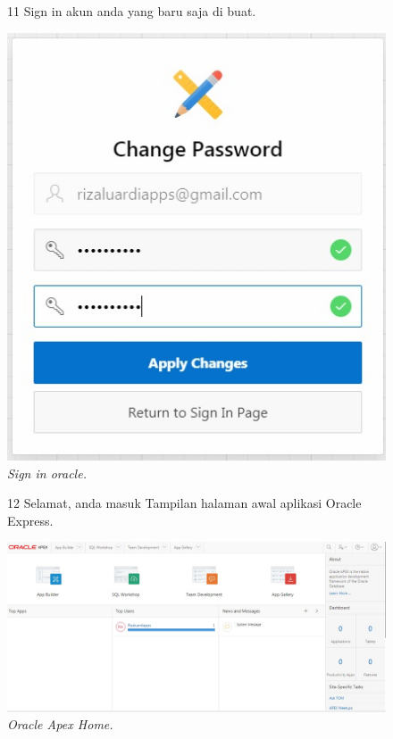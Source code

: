 \begin{enumerate}
\begin{figure}
\item[11] Sign in akun anda yang baru saja di buat.

    \begin{center}
\includegraphics[scale=0.5]{figures/req9.jpg}
    \caption{\textit{Sign in oracle.}}
        \end{center}
\label{gambar}
\end{figure}

\begin{figure}
\item[12] Selamat, anda masuk Tampilan halaman awal aplikasi Oracle Express.

    \begin{center}
\includegraphics[scale=0.4]{figures/login1.jpg}
    \caption{\textit{Oracle Apex Home.}}
        \end{center}
\label{gambar}
\end{figure}


\end{enumerate}
